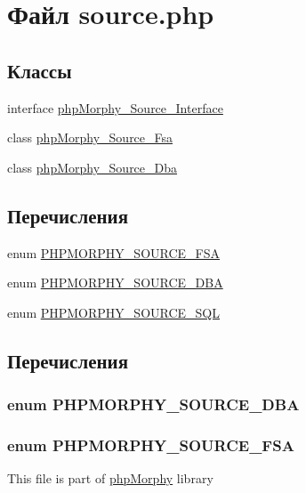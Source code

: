 \hypertarget{source_8php}{
\section{Файл source.php}
\label{source_8php}
}
\subsection*{Классы}
\begin{DoxyCompactItemize}
\item 
interface \hyperlink{interfacephpMorphy__Source__Interface}{phpMorphy\_\-Source\_\-Interface}
\item 
class \hyperlink{classphpMorphy__Source__Fsa}{phpMorphy\_\-Source\_\-Fsa}
\item 
class \hyperlink{classphpMorphy__Source__Dba}{phpMorphy\_\-Source\_\-Dba}
\end{DoxyCompactItemize}
\subsection*{Перечисления}
\begin{DoxyCompactItemize}
\item 
enum \hyperlink{source_8php_a33a1db3183bf24610fd6ff6f9f9f1fa7}{PHPMORPHY\_\-SOURCE\_\-FSA} 
\item 
enum \hyperlink{source_8php_ab990a6cd341084a2928528ade5596adc}{PHPMORPHY\_\-SOURCE\_\-DBA} 
\item 
enum \hyperlink{source_8php_a82d38ab6f7e78690e5c14388aa7481b5}{PHPMORPHY\_\-SOURCE\_\-SQL} 
\end{DoxyCompactItemize}


\subsection{Перечисления}
\hypertarget{source_8php_ab990a6cd341084a2928528ade5596adc}{
\subsubsection[{PHPMORPHY\_\-SOURCE\_\-DBA}]{\setlength{\rightskip}{0pt plus 5cm}enum {\bf PHPMORPHY\_\-SOURCE\_\-DBA}}}
\label{source_8php_ab990a6cd341084a2928528ade5596adc}
\hypertarget{source_8php_a33a1db3183bf24610fd6ff6f9f9f1fa7}{
\subsubsection[{PHPMORPHY\_\-SOURCE\_\-FSA}]{\setlength{\rightskip}{0pt plus 5cm}enum {\bf PHPMORPHY\_\-SOURCE\_\-FSA}}}
\label{source_8php_a33a1db3183bf24610fd6ff6f9f9f1fa7}
This file is part of \hyperlink{classphpMorphy}{phpMorphy} library

